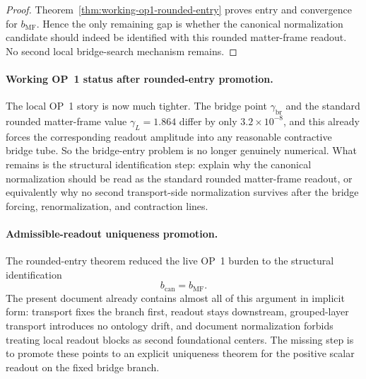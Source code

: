 \begin{proof}
Theorem~\ref{thm:working-op1-rounded-entry} proves entry and convergence for \(b_{\mathrm{MF}}\). Hence the only remaining gap is whether the canonical normalization candidate should indeed be identified with this rounded matter-frame readout. No second local bridge-search mechanism remains.
\end{proof}

\paragraph{Working OP~1 status after rounded-entry promotion.}
The local OP~1 story is now much tighter. The bridge point \(\gamma_{\mathrm{br}}\) and the standard rounded matter-frame value \(\gamma_L=1.864\) differ by only \(3.2\times 10^{-8}\), and this already forces the corresponding readout amplitude into any reasonable contractive bridge tube. So the bridge-entry problem is no longer genuinely numerical. What remains is the structural identification step: explain why the canonical normalization should be read as the standard rounded matter-frame readout, or equivalently why no second transport-side normalization survives after the bridge forcing, renormalization, and contraction lines.


\paragraph{Admissible-readout uniqueness promotion.}
The rounded-entry theorem reduced the live OP~1 burden to the structural identification
\[
  b_{\mathrm{can}}=b_{\mathrm{MF}}.
\]
The present document already contains almost all of this argument in implicit form: transport fixes the branch first, readout stays downstream, grouped-layer transport introduces no ontology drift, and document normalization forbids treating local readout blocks as second foundational centers. The missing step is to promote these points to an explicit uniqueness theorem for the positive scalar readout on the fixed bridge branch.

